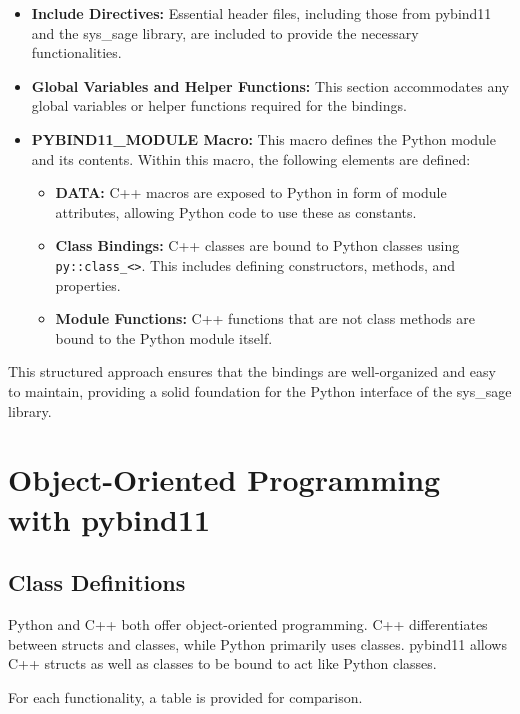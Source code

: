 \begin{itemize}
    \item   \textbf{Include Directives:} Essential header files, including those from pybind11 and the sys\_sage library, are included to provide the necessary functionalities.
    \item   \textbf{Global Variables and Helper Functions:} This section accommodates any global variables or helper functions required for the bindings.
    \item   \textbf{PYBIND11\_MODULE Macro:} This macro defines the Python module and its contents. Within this macro, the following elements are defined:
        \begin{itemize}
            \item   \textbf{DATA:} C++ macros are exposed to Python in form of module attributes, allowing Python code to use these as constants.
            \item   \textbf{Class Bindings:} C++ classes are bound to Python classes using \verb|py::class_<>|. This includes defining constructors, methods, and properties.
            \item   \textbf{Module Functions:} C++ functions that are not class methods are bound to the Python module itself.
        \end{itemize}
\end{itemize}

This structured approach ensures that the bindings are well-organized and easy to maintain, providing a solid foundation for the Python interface of the sys\_sage library.


\section{Object-Oriented Programming with pybind11}

\subsection{Class Definitions}

Python and C++ both offer object-oriented programming. C++ differentiates between structs and classes, while Python primarily uses classes. pybind11 allows C++ structs as well as classes to be bound to act like Python classes. \cite[see The Basics/Object-Oriented Code]{pybind11-docu}

For each functionality, a table is provided for comparison.
        

